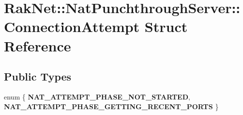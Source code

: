 \hypertarget{struct_rak_net_1_1_nat_punchthrough_server_1_1_connection_attempt}{\section{Rak\-Net\-:\-:Nat\-Punchthrough\-Server\-:\-:Connection\-Attempt Struct Reference}
\label{struct_rak_net_1_1_nat_punchthrough_server_1_1_connection_attempt}
}
\subsection*{Public Types}
\begin{DoxyCompactItemize}
\item 
enum \{ {\bfseries N\-A\-T\-\_\-\-A\-T\-T\-E\-M\-P\-T\-\_\-\-P\-H\-A\-S\-E\-\_\-\-N\-O\-T\-\_\-\-S\-T\-A\-R\-T\-E\-D}, 
{\bfseries N\-A\-T\-\_\-\-A\-T\-T\-E\-M\-P\-T\-\_\-\-P\-H\-A\-S\-E\-\_\-\-G\-E\-T\-T\-I\-N\-G\-\_\-\-R\-E\-C\-E\-N\-T\-\_\-\-P\-O\-R\-T\-S}
 \}
\end{DoxyCompactItemize}
